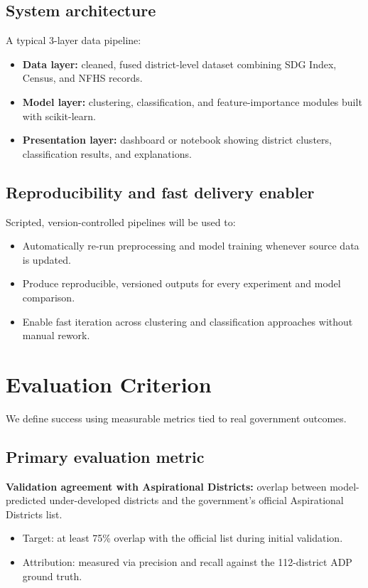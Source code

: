 \documentclass[11pt,a4paper]{article}
\newcommand{\BvrHint}[1]{%
  {\normalfont\normalsize\itshape\hfill #1}}
\begin{document}
\subsection{System architecture %
}
A typical 3-layer data pipeline:
\begin{itemize}[leftmargin=0.7cm]
    \item \textbf{Data layer:} cleaned, fused district-level dataset combining SDG Index, Census, and NFHS records.
    \item \textbf{Model layer:} clustering, classification, and feature-importance modules built with scikit-learn.
    \item \textbf{Presentation layer:} dashboard or notebook showing district clusters, classification results, and explanations.
\end{itemize}

\subsection{Reproducibility and fast delivery enabler}
Scripted, version-controlled pipelines will be used to:
\begin{itemize}[leftmargin=0.7cm]
    \item Automatically re-run preprocessing and model training whenever source data is updated.
    \item Produce reproducible, versioned outputs for every experiment and model comparison.
    \item Enable fast iteration across clustering and classification approaches without manual rework.
\end{itemize}

\section{Evaluation Criterion %
}
We define success using measurable metrics tied to real government outcomes.

\subsection{Primary evaluation metric}
\textbf{Validation agreement with Aspirational Districts:} overlap between model-predicted under-developed districts and the government's official Aspirational Districts list.
\begin{itemize}[leftmargin=0.7cm]
    \item Target: at least 75\% overlap with the official list during initial validation.
    \item Attribution: measured via precision and recall against the 112-district ADP ground truth.
\end{itemize}
\end{document}
